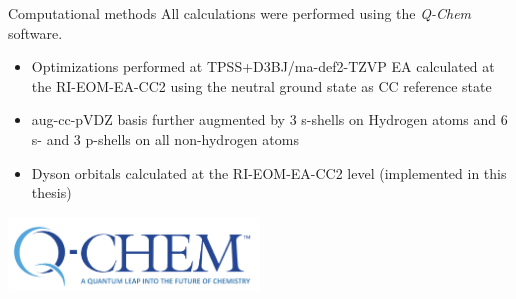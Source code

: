 \documentclass[9pt,t,xcolor=table]{beamer}
\begin{document}
\begin{frame}{\huge Computational methods}\large
	All calculations were performed using the \textit{Q-Chem} software.
	\begin{itemize}
		\item Optimizations performed at TPSS+D3BJ/ma-def2-TZVP
		EA calculated at the RI-EOM-EA-CC2 using the neutral ground state as CC reference state
		\item aug-cc-pVDZ basis further augmented by 3 s-shells on Hydrogen atoms and 6 s- and 3 p-shells on all non-hydrogen atoms
		\item Dyson orbitals calculated at the RI-EOM-EA-CC2 level (implemented in this thesis)
	\end{itemize}
	\vfill
	\centering
	\includegraphics[width=0.5\textwidth]{Figs/QCLogo.png}
	\vfill
\end{frame}
\end{document}
